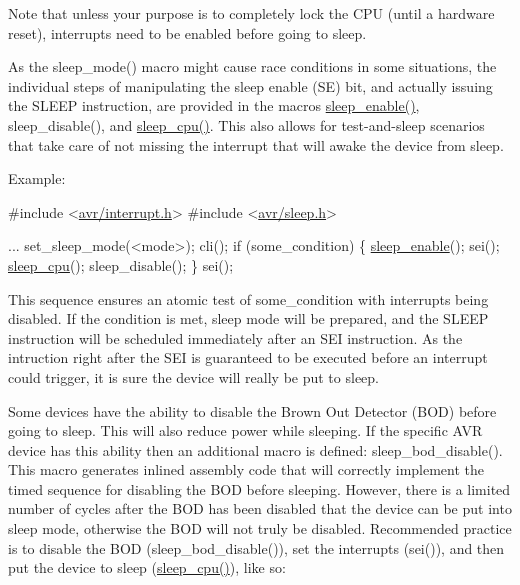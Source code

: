 Note that unless your purpose is to completely lock the C\+PU (until a hardware reset), interrupts need to be enabled before going to sleep.

As the {\ttfamily sleep\+\_\+mode()} macro might cause race conditions in some situations, the individual steps of manipulating the sleep enable (SE) bit, and actually issuing the {\ttfamily S\+L\+E\+EP} instruction, are provided in the macros {\ttfamily \hyperlink{group__avr__sleep_ga3f159a946a8e6df0ea4d67414e9a8d87}{sleep\+\_\+enable()}}, {\ttfamily sleep\+\_\+disable()}, and {\ttfamily \hyperlink{group__avr__sleep_ga86db03d7b75cab8008152e846940e549}{sleep\+\_\+cpu()}}. This also allows for test-\/and-\/sleep scenarios that take care of not missing the interrupt that will awake the device from sleep.

Example\+: 
\begin{DoxyCode}
\textcolor{preprocessor}{#include <\hyperlink{interrupt_8h}{avr/interrupt.h}>}
\textcolor{preprocessor}{#include <\hyperlink{sleep_8h}{avr/sleep.h}>}

...
  set\_sleep\_mode(<mode>);
  cli();
  \textcolor{keywordflow}{if} (some\_condition)
  \{
    \hyperlink{group__avr__sleep_ga3f159a946a8e6df0ea4d67414e9a8d87}{sleep\_enable}();
    sei();
    \hyperlink{group__avr__sleep_ga86db03d7b75cab8008152e846940e549}{sleep\_cpu}();
    sleep\_disable();
  \}
  sei();
\end{DoxyCode}


This sequence ensures an atomic test of {\ttfamily some\+\_\+condition} with interrupts being disabled. If the condition is met, sleep mode will be prepared, and the {\ttfamily S\+L\+E\+EP} instruction will be scheduled immediately after an {\ttfamily S\+EI} instruction. As the intruction right after the {\ttfamily S\+EI} is guaranteed to be executed before an interrupt could trigger, it is sure the device will really be put to sleep.

Some devices have the ability to disable the Brown Out Detector (B\+OD) before going to sleep. This will also reduce power while sleeping. If the specific A\+VR device has this ability then an additional macro is defined\+: {\ttfamily sleep\+\_\+bod\+\_\+disable()}. This macro generates inlined assembly code that will correctly implement the timed sequence for disabling the B\+OD before sleeping. However, there is a limited number of cycles after the B\+OD has been disabled that the device can be put into sleep mode, otherwise the B\+OD will not truly be disabled. Recommended practice is to disable the B\+OD ({\ttfamily sleep\+\_\+bod\+\_\+disable()}), set the interrupts ({\ttfamily sei()}), and then put the device to sleep ({\ttfamily \hyperlink{group__avr__sleep_ga86db03d7b75cab8008152e846940e549}{sleep\+\_\+cpu()}}), like so\+:


